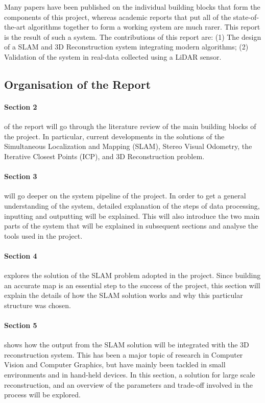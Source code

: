 \documentclass[12pt]{article}
\begin{document}
Many papers have been published on the individual building blocks that form the components of this project, whereas academic reports that put all of the state-of-the-art algorithms together to form a working system are much rarer. This report is the result of such a system. The contributions of this report are: (1) The design of a SLAM and 3D Reconstruction system integrating modern algorithms; (2) Validation of the system in real-data collected using a LiDAR sensor.
	
	\subsection{ Organisation of the Report}

\paragraph{Section 2} of the report will go through the literature review of the main building blocks of the project. In particular, current developments in the solutions of the Simultaneous Localization and Mapping (SLAM), Stereo Visual Odometry, the Iterative Closest Points (ICP), and 3D Reconstruction problem.
	
\paragraph{Section 3} will go deeper on the system pipeline of the project. In order to get a general understanding of the system, detailed explanation of the steps of data processing, inputting and outputting will be explained. This will also introduce the two main parts of the system that will be explained in subsequent sections and analyse the tools used in the project.
		
\paragraph{Section 4} explores the solution of the SLAM problem adopted in the project. Since building an accurate map is an essential step to the success of the project, this section will explain the details of how the SLAM solution works and why this particular structure was chosen.
		
\paragraph{Section 5} shows how the output from the SLAM solution will be integrated with the 3D reconstruction system. This has been a major topic of research in Computer Vision and Computer Graphics, but have mainly been tackled in small environments and in hand-held devices. In this section, a solution for large scale reconstruction, and an overview of the parameters and trade-off involved in the process will be explored.
		
\end{document}
